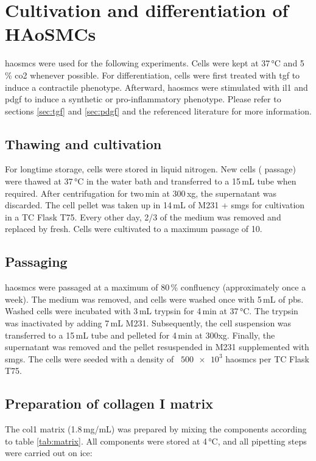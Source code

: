 \section{Cultivation and differentiation of HAoSMCs}
\label{sec:cultivation}
\Acp{haosmc} were used for the following experiments. Cells were kept at 37\,°C and 5\,\% \ac{co2} whenever possible. For differentiation, cells were first treated with \ac{tgf} to induce a contractile phenotype. Afterward, \acp{haosmc} were stimulated with \acf{il1} and \ac{pdgf} to induce a synthetic or pro-inflammatory phenotype. Please refer to sections \ref{sec:tgf} and \ref{sec:pdgf} and the referenced literature for more information.

    \subsection{Thawing and cultivation}
    For longtime storage, cells were stored in liquid nitrogen. New cells ( passage) were thawed at 37\,°C in the water bath and transferred to a 15\,mL tube when required. After centrifugation for two\,min at 300\,xg, the supernatant was discarded. The cell pellet was taken up in 14\,mL of \ac{M231} + \ac{smgs} for cultivation in a TC Flask T75. Every other day, 2/3 of the medium was removed and replaced by fresh. Cells were cultivated to a maximum passage of 10.

    \subsection{Passaging}
    \acp{haosmc} were passaged at a maximum of 80\,\% confluency (approximately once a week). The medium was removed, and cells were washed once with 5\,mL of \ac{pbs}. Washed cells were incubated with 3\,mL trypsin for 4\,min at 37\,°C. The trypsin was inactivated by adding 7\,mL \ac{M231}. Subsequently, the cell suspension was transferred to a 15\,mL tube and pelleted for 4\,min at 300xg. Finally, the supernatant was removed and the pellet resuspended in \ac{M231} supplemented with \ac{smgs}. The cells were seeded with a density of ~$\num{500e3}$ \acp{haosmc} per TC Flask T75.

    \subsection{Preparation of collagen I matrix}
    \label{subsec:matrix}
    The \ac{col1} matrix (1.8\,mg/mL) was prepared by mixing the components according to table \ref{tab:matrix}. All components were stored at 4\,°C, and all pipetting steps were carried out on ice:

